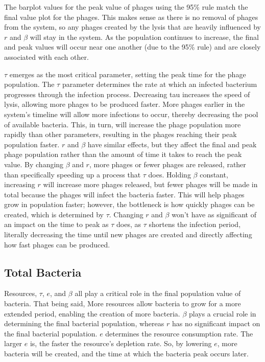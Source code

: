 The barplot values for the peak value of phages using the 95\% rule match the final value plot for the phages. 
This makes sense as there is no removal of phages from the system, so any phages created by the lysis that are heavily influenced by $r$ and $\beta$ will stay in the system. 
As the population continues to increase, the final and peak values will occur near one another (due to the 95\% rule) and are closely associated with each other.

$\tau$ emerges as the most critical parameter, setting the peak time for the phage population. 
The $\tau$ parameter determines the rate at which an infected bacterium progresses through the infection process. 
Decreasing tau increases the speed of lysis, allowing more phages to be produced faster. 
More phages earlier in the system's timeline will allow more infections to occur, thereby decreasing the pool of available bacteria. 
This, in turn, will increase the phage population more rapidly than other parameters, resulting in the phages reaching their peak population faster.
$r$ and $\beta$ have similar effects, but they affect the final and peak phage population rather than the amount of time it takes to reach the peak value. 
By changing $\beta$ and $r$, more phages or fewer phages are released, rather than specifically speeding up a process that $\tau$ does. 
Holding $\beta$ constant, increasing $r$ will increase more phages released, but fewer phages will be made in total because the phages will infect the bacteria faster. 
This will help phages grow in population faster; however, the bottleneck is how quickly phages can be created, which is determined by $\tau$. 
Changing $r$ and $\beta$ won't have as significant of an impact on the time to peak as $\tau$ does, as $\tau$ shortens the infection period, literally decreasing the time until new phages are created and directly affecting how fast phages can be produced. 

\subsection{Total Bacteria}
Resources, $\tau$, $e$, and $\beta$ all play a critical role in the final population value of bacteria. 
That being said, 
More resources allow bacteria to grow for a more extended period, enabling the creation of more bacteria. 
$\beta$ plays a crucial role in determining the final bacterial population, whereas $r$ has no significant impact on the final bacterial population. 
$e$ determines the resource consumption rate. 
The larger $e$ is, the faster the resource's depletion rate. 
So, by lowering $e$, more bacteria will be created, and the time at which the bacteria peak occurs later. 

